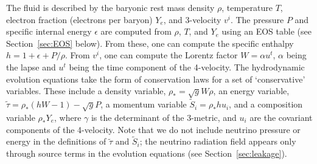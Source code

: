 The fluid is described by the baryonic rest mass density $\rho$, temperature $T$,
electron fraction (electrons per baryon) $Y_e$, and 3-velocity $v^i$.  The
pressure $P$ and specific internal energy $\epsilon$ are computed from
$\rho$, $T$, and $Y_e$ using an EOS table (see
Section~\ref{sec:EOS} below).  From these, one can compute the specific
enthalpy $h=1+\epsilon+P/\rho$.  From $v^i$, one can compute the Lorentz
factor $W=\alpha u^t$, $\alpha$ being the lapse and $u^t$ being the time
component of the 4-velocity.  The hydrodynamic evolution equations take
the form of conservation laws for a set of `conservative' variables.  These
include a density variable, $\rho_*=\sqrt{g}W\rho$, an energy variable,
$\tilde\tau=\rho_*(hW-1)-\sqrt{g}P$, a momentum variable
$\tilde S_i=\rho_*hu_i$, and a composition variable $\rho_*Y_e$, where
$\gamma$ is the determinant of the 3-metric, and $u_i$ are the covariant
components of the 4-velocity.  Note that we do not include neutrino
pressure or energy in the definitions of $\tilde\tau$ and $\tilde S_i$;
the neutrino radiation field appears only through source terms in the
evolution equations (see Section~\ref{sec:leakage}).

